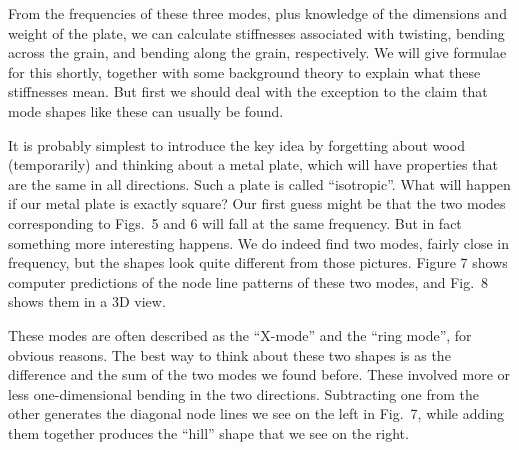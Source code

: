 


  From the frequencies of these three modes, plus knowledge of the dimensions 
  and weight of the plate, we can calculate stiffnesses associated with 
  twisting, bending across the grain, and bending along the grain, 
  respectively. We will give formulae for this shortly, together with some 
  background theory to explain what these stiffnesses mean. But first we should 
  deal with the exception to the claim that mode shapes like these can usually 
  be found. 

  It is probably simplest to introduce the key idea by forgetting about wood 
  (temporarily) and thinking about a metal plate, which will have properties 
  that are the same in all directions. Such a plate is called “isotropic”. What 
  will happen if our metal plate is exactly square? Our first guess might be 
  that the two modes corresponding to Figs.\ 5 and 6 will fall at the same 
  frequency. But in fact something more interesting happens. We do indeed find 
  two modes, fairly close in frequency, but the shapes look quite different 
  from those pictures. Figure 7 shows computer predictions of the node line 
  patterns of these two modes, and Fig.\ 8 shows them in a 3D view. 



  These modes are often described as the “X-mode” and the “ring mode”, for 
  obvious reasons. The best way to think about these two shapes is as the 
  difference and the sum of the two modes we found before. These involved more 
  or less one-dimensional bending in the two directions. Subtracting one from 
  the other generates the diagonal node lines we see on the left in Fig.\ 7, 
  while adding them together produces the “hill” shape that we see on the 
  right. 

